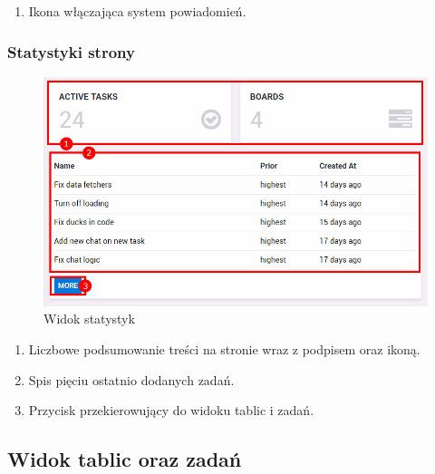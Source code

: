 \documentclass[eng,printmode]{mgr}
\begin{document}
\begin{enumerate}
  \item Ikona włączająca system powiadomień.
\end{enumerate}
\newpage

\subsubsection{Statystyki strony}
\begin{figure}[H]
  \begin{center}
  \includegraphics[scale=0.75]{stats}
  \end{center}
  \caption{Widok statystyk}
\end{figure}
\begin{enumerate}
  \item Liczbowe podsumowanie treści na stronie wraz z podpisem oraz ikoną.
  \item Spis pięciu ostatnio dodanych zadań.
  \item Przycisk przekierowujący do widoku tablic i zadań.
\end{enumerate}
\newpage

\subsection{Widok tablic oraz zadań}
\end{document}
